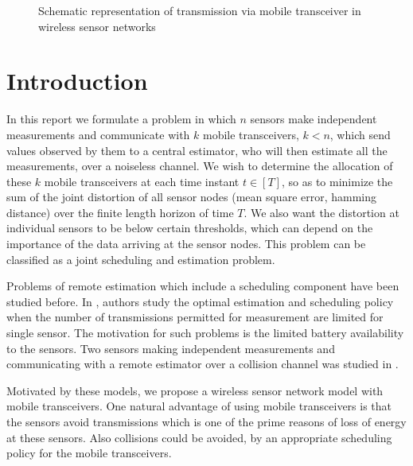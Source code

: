 \documentclass[a4paper,english,12pt]{article}
\begin{document}
\begin{figure}[!b]
	
	
	\caption{Schematic representation of transmission via mobile transceiver in wireless sensor networks}
	
	
\end{figure}

\section{Introduction}



In this report we formulate a  problem in which $n$ sensors make independent measurements and communicate with $k$ mobile transceivers, $k<n$, which send values observed by them  to a central estimator, who will then estimate all the measurements, over a noiseless channel. We wish to determine the allocation of these $k$  mobile transceivers  at each time instant $t \in [T]$, so as to minimize the sum of the joint distortion of all sensor nodes (mean square error, hamming distance) over the finite length horizon of time $T$. We also want the distortion at individual sensors to be below certain thresholds, which can depend on the importance of the data arriving at the sensor nodes. This problem can be classified as a joint scheduling and estimation problem.

Problems of remote estimation which include a scheduling component have been studied before. In \cite{imer2005optimal}, \cite{imer2010optimal} authors study the optimal estimation  and scheduling policy when the number of transmissions permitted for measurement are limited for single sensor. The motivation for such problems is the limited battery availability to the sensors.
Two sensors making independent measurements and communicating with a remote estimator over a collision channel was studied in
\cite{vasconcelos2013estimation}.

Motivated by these models, we propose a wireless sensor network model with mobile transceivers. 
One natural advantage of using mobile transceivers is that the sensors avoid  transmissions  which is one of the prime reasons of loss of energy at these sensors. Also collisions could be avoided, by an appropriate scheduling policy for the mobile transceivers.
\end{document}
